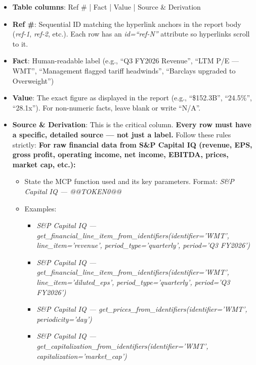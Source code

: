 \documentclass[11pt]{article}
\begin{document}
\begin{itemize}[leftmargin=*,itemsep=2pt,topsep=2pt]
\item {} \textbf{Table columns}: Ref \# | Fact | Value | Source \& Derivation
\item {} \textbf{Ref \#}: Sequential ID matching the hyperlink anchors in the report body (\emph{ref-1}, \emph{ref-2}, etc.). Each row has an \emph{id=``ref-N''} attribute so hyperlinks scroll to it.
\item {} \textbf{Fact}: Human-readable label (e.g., ``Q3 FY2026 Revenue'', ``LTM P/E — WMT'', ``Management flagged tariff headwinds'', ``Barclays upgraded to Overweight'')
\item {} \textbf{Value}: The exact figure as displayed in the report (e.g., ``\$152.3B'', ``24.5\%'', ``28.1x''). For non-numeric facts, leave blank or write ``N/A''.
\item {} \textbf{Source \& Derivation}: This is the critical column. \textbf{Every row must have a specific, detailed source — not just a label.} Follow these rules strictly: \textbf{For raw financial data from S\&P Capital IQ (revenue, EPS, gross profit, operating income, net income, EBITDA, prices, market cap, etc.):}
\begin{itemize}[leftmargin=*,itemsep=2pt,topsep=2pt]
\item {} State the MCP function used and its key parameters. Format: \emph{S\&P Capital IQ — @@TOKEN0@@}
\item {} Examples:
\begin{itemize}[leftmargin=*,itemsep=2pt,topsep=2pt]
\item {} \emph{S\&P Capital IQ — get\_\allowbreak{}financial\_\allowbreak{}line\_\allowbreak{}item\_\allowbreak{}from\_\allowbreak{}identifiers(identifier='WMT', line\_\allowbreak{}item='revenue', period\_\allowbreak{}type='quarterly', period='Q3 FY2026')}
\item {} \emph{S\&P Capital IQ — get\_\allowbreak{}financial\_\allowbreak{}line\_\allowbreak{}item\_\allowbreak{}from\_\allowbreak{}identifiers(identifier='WMT', line\_\allowbreak{}item='diluted\_\allowbreak{}eps', period\_\allowbreak{}type='quarterly', period='Q3 FY2026')}
\item {} \emph{S\&P Capital IQ — get\_\allowbreak{}prices\_\allowbreak{}from\_\allowbreak{}identifiers(identifier='WMT', periodicity='day')}
\item {} \emph{S\&P Capital IQ — get\_\allowbreak{}capitalization\_\allowbreak{}from\_\allowbreak{}identifiers(identifier='WMT', capitalization='market\_\allowbreak{}cap')}

\end{itemize}
\end{itemize}
\end{itemize}
\end{document}
